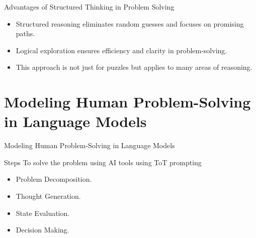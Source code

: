 \documentclass[aspectratio=169, xcolor={dvipsnames}, 10pt, brazil]{beamer}
\begin{document}
\begin{frame}{Advantages of Structured Thinking in Problem Solving}
    \begin{itemize}
        \item Structured reasoning eliminates random guesses and focuses on promising paths.
        \pause
        \item Logical exploration ensures efficiency and clarity in problem-solving.
        \pause
        \item This approach is not just for puzzles but applies to many areas of reasoning.
    \end{itemize}
    \vspace{0.5cm}
  
\end{frame}

\section{Modeling Human Problem-Solving in Language Models}
\begin{frame}{Modeling Human Problem-Solving in Language Models}
\begin{block}{Steps To solve the problem using AI tools using ToT prompting}

\begin{itemize}
\centering
    \item Problem Decomposition.
    
    \pause
    \item Thought Generation.
    \pause
    \item State Evaluation.
    \pause
    \item  Decision Making.
\end{itemize}
    
\end{block}
\end{frame}
\end{document}
